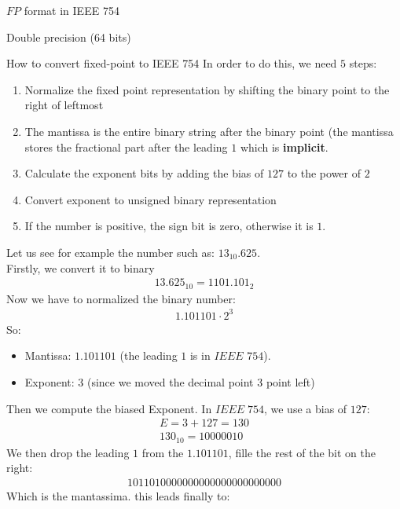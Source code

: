 \begin{parag}{$FP$ format in IEEE 754}
\begin{subparag}{Double precision (64 bits)}
        
    \end{subparag}
    \begin{subparag}{How to convert fixed-point to IEEE 754}
        In order to do this, we need $5$ steps:
        \begin{enumerate}
            \item Normalize the fixed point representation by shifting the binary point to the right of leftmost
            \item The mantissa is the entire binary string after the binary point (the mantissa stores the fractional part after the leading $1$ which is \textbf{implicit}.
            \item Calculate the exponent bits by adding the bias of $127$ to the power of $2$
            \item Convert exponent to unsigned binary representation
            \item If the number is positive, the sign bit is zero, otherwise it is $1$.
        \end{enumerate}
        Let us see for example the number such as: $13_{10}.625$. \\
        Firstly, we convert it to binary
        \begin{align*}
            13.625_{10} = 1101.101_2
        \end{align*}
        Now we have to normalized the binary number:
        \begin{align*}
            1.101101 \cdot 2^3
        \end{align*}
        So:
        \begin{itemize}
            \item Mantissa: $1.101101$ (the leading $1$ is  in $IEEE$ $754$).
            \item Exponent: $3$ (since we moved the decimal point $3$ point left)
        \end{itemize}
        Then we compute the biased Exponent. In $IEEE\; 754$, we use a bias of $127$:
        \begin{align*}
            E = 3 + 127 = 130 \\
            130_{10} = 10000010
        \end{align*}
        We then drop the leading $1$ from the $1.101101$, fille the rest of the bit on the right:
        \begin{align*}
            1011010000000000000000000000
        \end{align*}
        Which is the mantassima. this leads finally to:

\end{subparag}
\end{parag}
